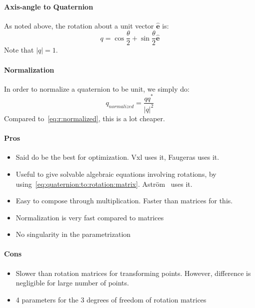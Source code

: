 \paragraph{Axis-angle to Quaternion}
As noted above, the rotation about a unit vector $\hat{\mathbf e}$ is:
\begin{equation}
q = \cos \frac{\theta}{2} + \sin \frac{\theta}{2}\hat {\mathbf e}
\end{equation}
Note that $|q| = 1$. 

\paragraph{Normalization}
In order to normalize a quaternion to be unit, we simply do:
\begin{equation}
q_{normalized} = \frac{qq^*}{|q|^2}
\end{equation}
Compared to~\eqref{eq:r:normalized}, this is a lot cheaper.


\paragraph{Pros}
\begin{itemize}
\item Said do be the best for optimization. Vxl uses it, Faugeras uses it.
\item Useful to give solvable algebraic equations involving rotations, by
using~\ref{eq:quaternion:to:rotation:matrix}.  Astr\"om~\cite{Astrom:etal:Polysolver:IJCV09} uses it. 
\item Easy to compose through multiplication. Faster than matrices for this.
\item Normalization is very fast compared to matrices
\item No singularity in the parametrization
\end{itemize}

\paragraph{Cons}
\begin{itemize}
\item Slower than rotation matrices for transforming points. However, difference
is negligible for large number of points.
\item 4 parameters for the 3 degrees of freedom of rotation matrices
\end{itemize}

